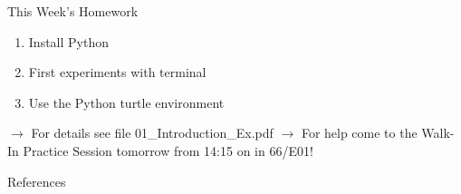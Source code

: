 \begin{frame}{This Week's Homework}

    \begin{enumerate}
        \item Install Python
        \item First experiments with terminal
        \item Use the Python turtle environment
    \end{enumerate}

    \vspace*{1em}

    $\rightarrow$ For details see file 01\_Introduction\_Ex.pdf \newline
    $\rightarrow$ For help come to the Walk-In Practice Session tomorrow from 14:15 on in 66/E01!


\end{frame}

\begin{frame}{References}
    \printbibliography
\end{frame}


